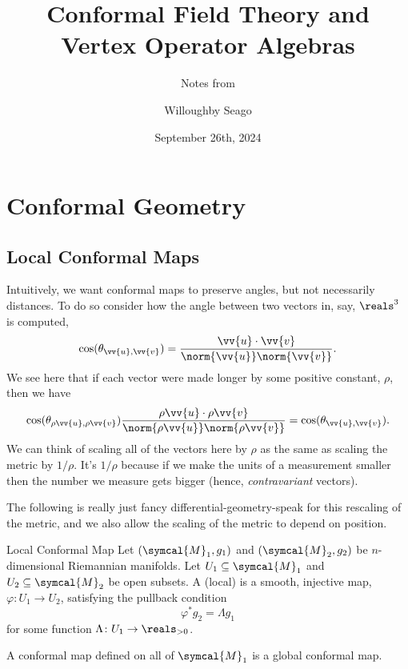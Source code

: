 \documentclass[fleqn]{NotesClass}
\title{Conformal Field Theory and Vertex Operator Algebras}
\author{Willoughby Seago}
\date{September 26th, 2024}
\subtitle{Notes from}
\newcommand{\manifold}{\symcal{M}}
\begin{document}
    \frontmatter
    \titlepage
    \innertitlepage{}
    \tableofcontents
    \mainmatter
    \chapter{Conformal Geometry}
    \section{Local Conformal Maps}
    Intuitively, we want conformal maps to preserve angles, but not necessarily distances.
    To do so consider how the angle between two vectors in, say, \(\reals^3\) is computed,
    \begin{equation}
        \cos(\theta_{\vv{u}, \vv{v}}) = \frac{\vv{u} \cdot \vv{v}}{\norm{\vv{u}} \norm{\vv{v}}} .
    \end{equation}
    We see here that if each vector were made longer by some positive constant, \(\rho\), then we have
    \begin{equation}
        \cos(\theta_{\rho \vv{u}, \rho \vv{v}})\frac{\rho \vv{u} \cdot \rho \vv{v}}{\norm{\rho \vv{u}} \norm{\rho \vv{v}}} = \cos(\theta_{\vv{u}, \vv{v}}).
    \end{equation}
    We can think of scaling all of the vectors here by \(\rho\) as the same as scaling the metric by \(1/\rho\).
    It's \(1/\rho\) because if we make the units of a measurement smaller then the number we measure gets bigger (hence, \emph{contravariant} vectors).
    
    The following is really just fancy differential-geometry-speak for this rescaling of the metric, and we also allow the scaling of the metric to depend on position.
    
    \begin{dfn}{Local Conformal Map}{}
        Let \((\manifold_1, g_1)\) and \((\manifold_2, g_2)\) be \(n\)-dimensional Riemannian manifolds.
        Let \(U_1 \subseteq \manifold_1\) and \(U_2 \subseteq \manifold_2\) be open subsets.
        A (local)  is a smooth, injective map, \(\varphi \colon U_1 \to U_2\), satisfying the pullback condition
        \begin{equation}
            \varphi^*g_2 = \Lambda g_1
        \end{equation}
        for some function \(\Lambda \colon U_1 \to \reals_{>0}\).
        
        A conformal map defined on all of \(\manifold_1\) is a global conformal map.
    \end{dfn}
    
\end{document}
